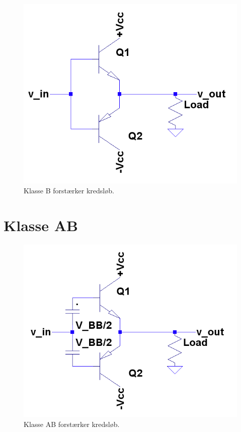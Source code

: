 \begin{figure}[h]
\centering
\includegraphics[scale=.6]{klasser/classb.png}
\caption{Klasse B forstærker kredsløb.}
\label{fig:classb}
\end{figure}

\section{Klasse AB}
\begin{figure}[h]
\centering
\includegraphics[scale=.6]{klasser/classab.png}
\caption{Klasse AB forstærker kredsløb.}
\label{fig:classab}
\end{figure}